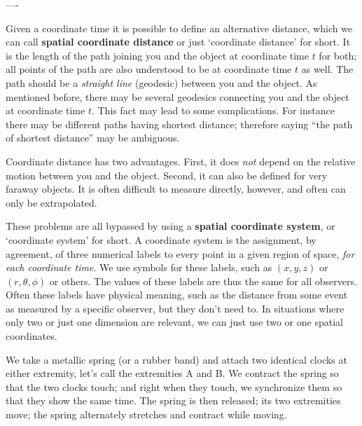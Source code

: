 



----

Given a coordinate time it is possible to define an alternative distance, which we can call \textbf{spatial coordinate distance} or just \enquote*{coordinate distance} for short. It is the length of the path joining you and the object at coordinate time $t$ for both; all points of the path are also understood to be at coordinate time $t$ as well. The path should be a \emph{straight line} (geodesic) between you and the object. As mentioned before, there may be several geodesics connecting you and the object at coordinate time $t$. This fact may lead to some complications. For instance there may be different paths having shortest distance; therefore saying \enquote{the path of shortest distance} may be ambiguous.

Coordinate distance has two advantages. First, it does \emph{not} depend on the relative motion between you and the object. Second, it can also be defined for very faraway objects. It is often difficult to measure directly, however, and often can only be extrapolated.



These problems are all bypassed by using a \textbf{spatial coordinate system}, or \enquote*{coordinate system} for short. A coordinate system is the assignment, by agreement, of three numerical labels to every point in a given region of space, \emph{for each coordinate time}. We use symbols for these labels, such as $(x,y,z)$ or $(r, \theta,\phi)$ or others. The values of these labels are thus the same for all observers. Often these labels have physical meaning, such as the distance from some event as measured by a specific observer, but they don't need to. In situations where only two or just one dimension are relevant, we can just use two or one spatial coordinates.



We take a metallic spring (or a rubber band) and attach two identical clocks at either extremity, let's call the extremities A and B. We contract the spring so that the two clocks touch; and right when they touch, we synchronize them so that they show the same time. The spring is then released; its two extremities move; the spring alternately stretches and contract while moving.


